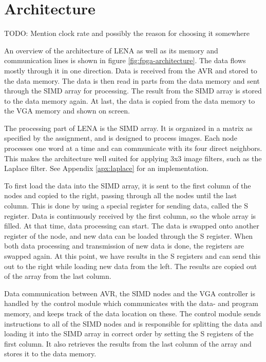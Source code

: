 \section{Architecture}



{\sc TODO: \color{red} Mention clock rate and possibly the reason for choosing
  it somewhere}

An overview of the architecture of \ac{LENA} as well as its memory and
communication lines is shown in figure \ref{fig:fpga-architecture}. The data
flows mostly through it in one direction. Data is received from the AVR and
stored to the data memory. The data is then read in parts from the data memory
and sent through the \ac{SIMD} array for processing. The result from the
\ac{SIMD} array is stored to the data memory again. At last, the data is copied
from the data memory to the \ac{VGA} memory and shown on screen.

The processing part of \ac{LENA} is the \ac{SIMD} array. It is organized in a
matrix as specified by the assignment, and is designed to process images. Each
node processes one word at a time and can communicate with its four direct
neighbors. This makes the architecture  well suited for applying 3x3
image filters, such as the Laplace filter. See Appendix \ref{apx:laplace} for an
implementation.

To first load the data into the \ac{SIMD} array, it is sent to the first column
of the nodes and copied to the right, passing through all the nodes until the
last column.  This is done by using a special register for sending data, called
the S register. Data is continuously
received by the first column, so the whole array is filled. At that time, data
processing can start. The data is swapped onto another register of the node, and
new data can be loaded through the S register.  When both data processing and
transmission of new data is done, the registers are swapped again. At this
point, we have results in the S registers and can send this out to the right
while loading new data from the left. The results are copied out of the array
from the last column.

Data communication between AVR, the \ac{SIMD} nodes and the \ac{VGA}
controller is handled by the control module which communicates with the data-
and program memory, and keeps track of the data location on these. The control
module sends instructions to all of the \ac{SIMD} nodes and is responsible for
splitting the data and loading it into the \ac{SIMD} array in correct order by
setting the S registers of the first column. It also retrieves the results from
the last column of the array and stores it to the data memory.

